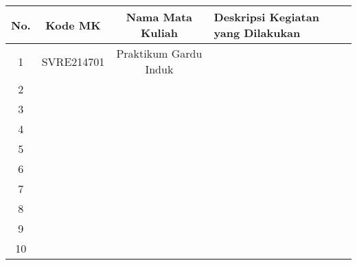 \begin{table}[h]
    \begin{tabular}{|c|c|c|l|}
        \hline
        No. & Kode MK & Nama Mata Kuliah & Deskripsi Kegiatan yang Dilakukan \\ \hline
        1 & SVRE214701 & Praktikum Gardu Induk &  \\ \hline
        2 & & & \\ \hline
        3 & & & \\ \hline
        4 & & & \\ \hline
        5 & & & \\ \hline
        6 & & & \\ \hline
        7 & & & \\ \hline
        8 & & & \\ \hline
        9 & & & \\ \hline
        10 & & & \\ \hline
    \end{tabular}
\end{table}